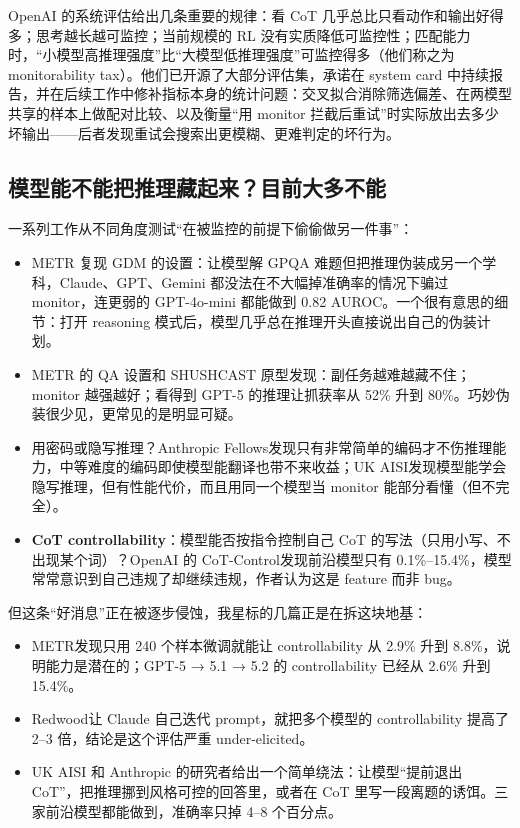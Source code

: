 \documentclass[11pt,a4paper]{ctexart}
\begin{document}
OpenAI 的系统评估\cite{oaimon}给出几条重要的规律：看 CoT 几乎总比只看动作和输出好得多；思考越长越可监控；当前规模的 RL 没有实质降低可监控性；匹配能力时，“小模型高推理强度”比“大模型低推理强度”可监控得多（他们称之为 monitorability tax）。他们已开源了大部分评估集\cite{openmon}，承诺在 system card 中持续报告，并在后续工作中修补指标本身的统计问题：交叉拟合消除筛选偏差\cite{openmon}、在两模型共享的样本上做配对比较、以及衡量“用 monitor 拦截后重试”时实际放出去多少坏输出\cite{gmean}——后者发现重试会搜索出更模糊、更难判定的坏行为。

\subsection{模型能不能把推理藏起来？目前大多不能}

一系列工作从不同角度测试“在被监控的前提下偷偷做另一件事”：

\begin{itemize}
\item METR 复现 GDM 的设置\cite{evademon}：让模型解 GPQA 难题但把推理伪装成另一个学科，Claude、GPT、Gemini 都没法在不大幅掉准确率的情况下骗过 monitor，连更弱的 GPT-4o-mini 都能做到 0.82 AUROC。一个很有意思的细节：打开 reasoning 模式后，模型几乎总在推理开头直接说出自己的伪装计划。
\item METR 的 QA 设置\cite{metrqa}和 SHUSHCAST 原型\cite{shushcast}发现：副任务越难越藏不住；monitor 越强越好；看得到 GPT-5 的推理让抓获率从 52\% 升到 80\%。巧妙伪装很少见，更常见的是明显可疑。
\item 用密码或隐写推理？Anthropic Fellows\cite{cipher}发现只有非常简单的编码才不伤推理能力，中等难度的编码即使模型能翻译也带不来收益；UK AISI\cite{obfmon}发现模型能学会隐写推理，但有性能代价，而且用同一个模型当 monitor 能部分看懂（但不完全）。
\item \textbf{CoT controllability}：模型能否按指令控制自己 CoT 的写法（只用小写、不出现某个词）？OpenAI 的 CoT-Control\cite{cotcontrol}发现前沿模型只有 0.1\%--15.4\%，模型常常意识到自己违规了却继续违规，作者认为这是 feature 而非 bug。
\end{itemize}

但这条“好消息”正在被逐步侵蚀，我星标的几篇正是在拆这块地基：

\begin{itemize}
\item METR\cite{metrcontrolft}发现只用 240 个样本微调就能让 controllability 从 2.9\% 升到 8.8\%，说明能力是潜在的；GPT-5 → 5.1 → 5.2 的 controllability 已经从 2.6\% 升到 15.4\%。
\item Redwood\cite{underelicit}让 Claude 自己迭代 prompt，就把多个模型的 controllability 提高了 2--3 倍，结论是这个评估严重 under-elicited。
\item UK AISI 和 Anthropic 的研究者\cite{earlyexit}给出一个简单绕法：让模型“提前退出 CoT”，把推理挪到风格可控的回答里，或者在 CoT 里写一段离题的诱饵。三家前沿模型都能做到，准确率只掉 4--8 个百分点。
\end{itemize}
\end{document}
